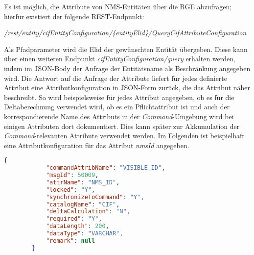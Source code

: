 \begin{enumerate}
    Es ist möglich, die Attribute von \ac{NMS}-Entitäten über die \ac{BGE} abzufragen; hierfür existiert der folgende \ac{REST}-Endpunkt: 
    \begin{center}
        \textit{/rest/entity/cifEntityConfiguration/\{entityElid\}/QueryCifAttributeConfiguration}
    \end{center}
    
    Als Pfadparameter wird die \ac{Elid} der gewünschten Entität übergeben. Diese kann über einen weiteren Endpunkt \textit{cifEntityConfiguration/query} erhalten werden, indem im \ac{JSON}-Body der Anfrage der Entitätsname als Beschränkung angegeben wird. Die Antwort auf die Anfrage der Attribute liefert für jedes definierte Attribut eine Attributkonfiguration in \ac{JSON}-Form zurück, die das Attribut näher beschreibt. So wird beispielsweise für jedes Attribut angegeben, ob es für die Deltaberechnung verwendet wird, ob es ein Pflichtattribut ist und auch der korrespondierende Name des Attributs in der \textit{Command}-Umgebung wird bei einigen Attributen dort dokumentiert. Dies kann später zur Akkumulation der \textit{Command}-relevanten Attribute verwendet werden. Im Folgenden ist beispielhaft eine Attributkonfiguration für das Attribut \textit{nmsId} angegeben.

    \begin{lstlisting}[caption=Attributkonfiguration für das Chassis-Attribut \textit{nmsId}, label=nmsId-Konfiguration,language=json]
        {
            "commandAttribName": "VISIBLE_ID",
            "msgId": 50009,
            "attrName": "NMS_ID",
            "locked": "Y",
            "synchronizeToCommand": "Y",
            "catalogName": "CIF",
            "deltaCalculation": "N",
            "required": "Y",
            "dataLength": 200,
            "dataType": "VARCHAR",
            "remark": null
        }
    \end{lstlisting}


\end{enumerate}
